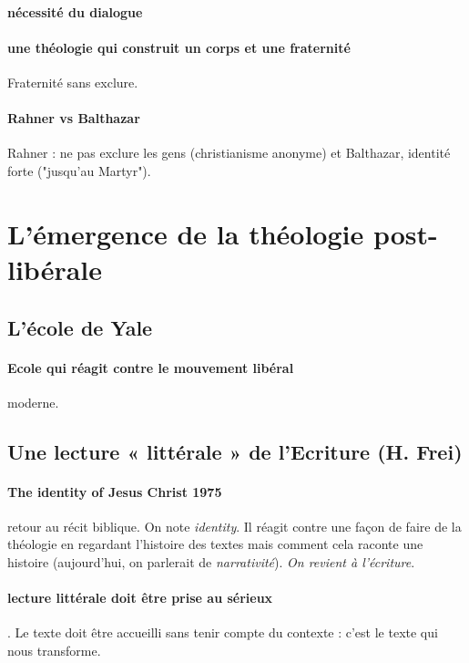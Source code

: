 \paragraph{nécessité du dialogue}

\paragraph{une théologie qui construit un corps et une fraternité} Fraternité sans exclure.

 \paragraph{Rahner vs Balthazar} Rahner : ne pas exclure les gens (christianisme anonyme) et Balthazar, identité forte ("jusqu'au Martyr").

 
\section{L’émergence de la théologie post-libérale}

\subsection{L’école de Yale}

\paragraph{Ecole qui réagit contre le mouvement libéral} moderne.

\subsection{Une lecture « littérale » de l’Ecriture (H. Frei)}
\paragraph{The identity of Jesus Christ 1975} retour au récit biblique. On note \textit{identity}. Il réagit contre une façon de faire de la théologie en regardant l'histoire des textes mais comment cela raconte une histoire (aujourd'hui, on parlerait de \textit{narrativité}). \textit{On revient à l'écriture}. 


\paragraph{lecture littérale doit être prise au sérieux} . Le texte doit être accueilli sans tenir compte du contexte : c'est le texte qui nous transforme.


